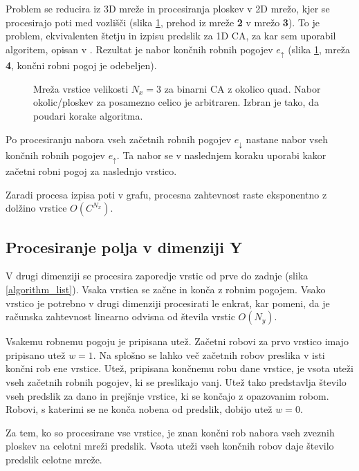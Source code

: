 \documentclass[12pt,a4paper,openany,twoside]{book}
\begin{document}
Problem se reducira iz 3D mreže in procesiranja ploskev v 2D mrežo,
kjer se procesirajo poti med vozlišči (slika \ref{algorithm_line},
prehod iz mreže \textbf{2} v mrežo \textbf{3}).
To je problem, ekvivalenten štetju in izpisu predslik za 1D CA,
za kar sem uporabil algoritem, opisan v \cite{JerasDobnikar2007}.
Rezultat je nabor končnih robnih pogojev \(e_{\uparrow}\)
(slika \ref{algorithm_line}, mreža \textbf{4}, končni robni pogoj je odebeljen).

\begin{figure}[htb]
\centerline{}
\caption[Algoritem procesiranja vrstice.]{Mreža vrstice velikosti \(N_x=3\) za binarni CA z okolico quad.
Nabor okolic/ploskev za posamezno celico je arbitraren. Izbran je tako, da poudari korake algoritma.}
\label{algorithm_line}
\end{figure}
\vspace{5mm}

Po procesiranju nabora vseh začetnih robnih pogojev \(e_{\downarrow}\)
nastane nabor vseh končnih robnih pogojev \(e_{\uparrow}\).
Ta nabor se v naslednjem koraku uporabi kakor začetni robni pogoj za naslednjo vrstico.

Zaradi procesa izpisa poti v grafu,
procesna zahtevnost raste eksponentno z dolžino vrstice \(O(C^{N_x})\).

\subsection{Procesiranje polja v dimenziji Y}

V drugi dimenziji se procesira zaporedje vrstic od prve do zadnje (slika \ref{algorithm_list}).
Vsaka vrstica se začne in konča z robnim pogojem.
Vsako vrstico je potrebno v drugi dimenziji procesirati le enkrat, kar pomeni,
da je računska zahtevnost linearno odvisna od števila vrstic \(O(N_y)\).

Vsakemu robnemu pogoju je pripisana utež. Začetni robovi za prvo vrstico imajo pripisano utež \(w=1\).
Na splošno se lahko več začetnih robov preslika v isti končni rob ene vrstice.
Utež, pripisana končnemu robu dane vrstice, je vsota uteži vseh začetnih robnih pogojev, ki se preslikajo vanj.
Utež tako predstavlja število vseh predslik za dano in prejšnje vrstice, ki se končajo z opazovanim robom.
Robovi, s katerimi se ne konča nobena od predslik, dobijo utež \(w=0\).

Za tem, ko so procesirane vse vrstice, je znan končni rob nabora vseh zveznih ploskev na celotni mreži predslik.
Vsota uteži vseh končnih robov daje število predslik celotne mreže.
\end{document}
